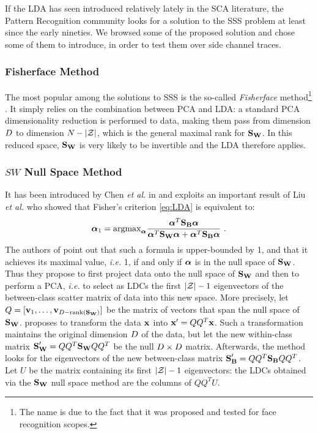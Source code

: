 If the LDA has seen introduced relatively lately in the SCA literature, the Pattern Recognition community looks for a solution to the SSS problem at least since the early nineties. We browsed some of the proposed solution and chose some of them to introduce, in order to test them over side channel traces.

\subsubsection{Fisherface Method}
The most popular among the solutions to SSS is the so-called {\em Fisherface} method\footnote{The name is due to the fact that it was proposed and tested for face recognition scopes.} \cite{eigenfaces}. It simply relies on the combination between PCA and LDA: a standard PCA dimensionality reduction is performed to data, making them pass from dimension $\traceLength$ to dimension $\numTraces[]-\lvert \sensVarSet \rvert$, which is the general maximal rank for $\SW$. In this reduced space, $\SW$ is very likely to be invertible and the LDA therefore applies.

\subsubsection{$SW$ Null Space Method}
It has been introduced by Chen {\em et al.} in \cite{Chen2000} and exploits an important result of Liu {\em et al.} \cite{liu1992generalized} who showed that Fisher's criterion \eqref{eq:LDA} is equivalent to:
 \begin{equation}
 \AAlpha_1=\mathrm{argmax}_{\AAlpha} \frac{\AAlpha^T \SB \AAlpha}{\AAlpha^T \SW \AAlpha + \AAlpha^T \SB \AAlpha} \mbox{ .}
 \end{equation}
The authors of \cite{Chen2000} point out that such a formula is upper-bounded by 1, and that it achieves its maximal value, \textit{i.e.} 1, if and only if  $\AAlpha$ is in the null space of $\SW$. Thus they propose to first project data onto the null space of $\SW$ and then to perform a PCA, \textit{i.e.} to select as LDCs the first $\lvert \sensVarSet \rvert - 1$ eigenvectors of the between-class scatter matrix of data into this new space. More precisely, let $Q = [\vvv_1, \dots, \vvv_{\traceLength - \mathrm{rank}(\SW)}]$ be the matrix of vectors that span the null space of $\SW$. \cite{Chen2000} proposes to transform the data $\sss[]{}$ into $\xxx' = QQ^T\xxx$. Such a transformation maintains the original dimension $\traceLength$ of the data, but let the new within-class matrix $\SW' = QQ^T\SW QQ^T$ be the null $\traceLength \times \traceLength$ matrix. Afterwards, the method looks for the eigenvectors of the new between-class matrix $\SB' = QQ^T\SB QQ^T$. Let $U$ be the matrix containing its first $\lvert \sensVarSet \rvert - 1$ eigenvectors: the LDCs obtained via the $\SW$ null space method are the columns of $QQ^TU$.

